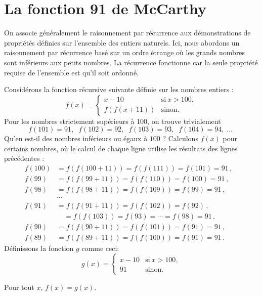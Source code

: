 \section{La fonction 91 de McCarthy}\label{s.induction-mccarthy}


On associe généralement le raisonnement par  récurrence aux démonstra\-tions  de propriétés définies sur l'ensemble des entiers naturels. Ici, nous abordons un raisonnement par  récurrence basé sur un ordre étrange où les grands nombres sont inférieurs aux petits nombres. La récurrence fonctionne car la seule propriété requise de l'ensemble est qu'il soit ordonné.

Considérons la fonction récursive suivante définie sur les nombres entiers :
\[
f(x) = \left \{\begin{array}{ll}
x-10 & \mathrm{si}\  x > 100, \\
f(f(x+11)) & \mathrm{sinon}.
\end{array}
\right.
\]
Pour les nombres strictement supérieurs à 100, on trouve trivialement
\[
f(101) = 91, \;\; f(102) = 92,\;\; f(103) = 93,\;\; f(104) = 94,\;\ldots\;
\]
Qu'en est-il des nombres inférieurs ou égaux à $100$ ? Calculons $f(x)$ pour certains nombres, où le calcul de chaque ligne utilise les résultats des lignes précédentes :
\begin{align*}
f(100) &= f(f(100+11)) = f(f(111)) = f(101) = 91\,,\\
f(99) &= f(f(99+11)) = f(f(110)) = f(100) = 91\,,\\
f(98) &= f(f(98+11)) = f(f(109)) = f(99) = 91\,,\\
&\cdots&\\
f(91) &= f(f(91+11)) = f(f(102)) = f(92)\,,\\
& \quad = f(f(103)) = f(93) = \cdots =f(98) = 91\,,\\
f(90) &= f(f(90+11)) = f(f(101)) = f(91) = 91\,,\\
f(89) &= f(f(89+11)) = f(f(100)) = f(91) = 91\,.
\end{align*}
Définissons la fonction $g$ comme ceci:
\[
g(x) = \left \{\begin{array}{ll}
x-10 & \mathrm{si}\  x > 100, \\
91 & \mathrm{sinon}.
\end{array}
\right.
\]

\begin{theorem}
Pour tout $x$, $f(x) = g(x)$.
\end{theorem}

